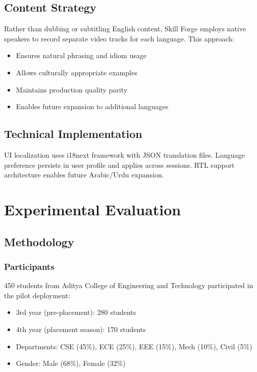 \documentclass[journal]{IEEEtran}
\begin{document}
\subsection{Content Strategy}

Rather than dubbing or subtitling English content, Skill Forge employs native speakers to record separate video tracks for each language. This approach:
\begin{itemize}
    \item Ensures natural phrasing and idiom usage
    \item Allows culturally appropriate examples
    \item Maintains production quality parity
    \item Enables future expansion to additional languages
\end{itemize}

\subsection{Technical Implementation}

UI localization uses i18next framework with JSON translation files. Language preference persists in user profile and applies across sessions. RTL support architecture enables future Arabic/Urdu expansion.

\section{Experimental Evaluation}
\label{sec:evaluation}

\subsection{Methodology}

\subsubsection{Participants}
450 students from Aditya College of Engineering and Technology participated in the pilot deployment:
\begin{itemize}
    \item 3rd year (pre-placement): 280 students
    \item 4th year (placement season): 170 students
    \item Departments: CSE (45\%), ECE (25\%), EEE (15\%), Mech (10\%), Civil (5\%)
    \item Gender: Male (68\%), Female (32\%)
\end{itemize}
\end{document}
